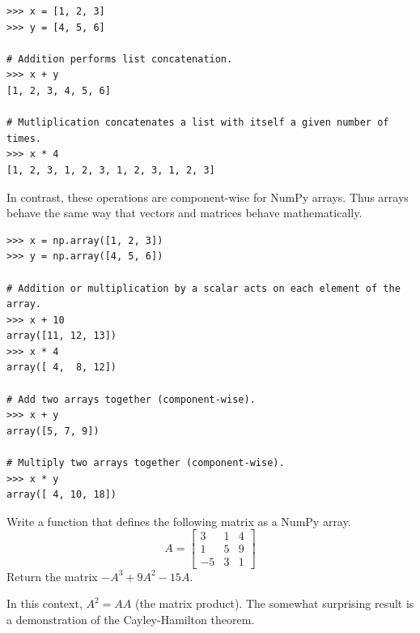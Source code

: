 \begin{lstlisting}
>>> x = [1, 2, 3]
>>> y = [4, 5, 6]

# Addition performs list concatenation.
>>> x + y
[1, 2, 3, 4, 5, 6]

# Mutliplication concatenates a list with itself a given number of times.
>>> x * 4
[1, 2, 3, 1, 2, 3, 1, 2, 3, 1, 2, 3]
\end{lstlisting}

In contrast, these operations are component-wise for NumPy arrays.
Thus arrays behave the same way that vectors and matrices behave mathematically.

\begin{lstlisting}
>>> x = np.array([1, 2, 3])
>>> y = np.array([4, 5, 6])

# Addition or multiplication by a scalar acts on each element of the array.
>>> x + 10
array([11, 12, 13])
>>> x * 4
array([ 4,  8, 12])

# Add two arrays together (component-wise).
>>> x + y
array([5, 7, 9])

# Multiply two arrays together (component-wise).
>>> x * y
array([ 4, 10, 18])
\end{lstlisting}

\begin{problem} %
Write a function that defines the following matrix as a NumPy array.
\[
A = \left[\begin{array}{rrr}
3 & 1 & 4\\
1 & 5 & 9 \\
-5 & 3 & 1 \end{array}\right]
\]
Return the matrix $-A^3 + 9A^2 - 15A$.

In this context, $A^2 = AA$ (the matrix product).
The somewhat surprising result is a demonstration of the Cayley-Hamilton theorem.
\label{prob:simple2}
\end{problem}

